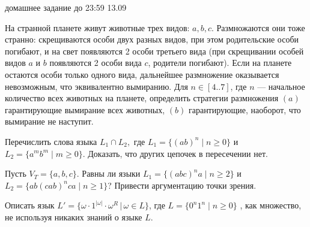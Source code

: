 \documentclass[12pt]{article}
\begin{document}

{\Large домашнее задание до 23:59 13.09}
\bigskip

\enumerate
{
  \item 
  {   
     На странной планете живут животные трех видов: $a, b, c$. Размножаются они тоже странно: скрещиваются особи двух разных видов, при этом родительские особи погибают, и на свет появляются 2 особи третьего вида (при скрещивании особей видов $a$ и $b$ появляются 2 особи вида $c$, родители погибают). Если на планете остаются особи только одного вида, дальнейшее размножение оказывается невозможным, что эквивалентно вымиранию. Для $n \in [4..7]$, где $n$ --- начальное количество всех животных на планете, определить стратегии размножения $(a)$ гарантирующие вымирание всех животных, $(b)$ гарантирующие, наоборот, что вымирание не наступит.
  }
  \item
  {
    Перечислить слова языка $L_1 \cap L_2,$ где $L_1 = \{ (ab)^n \mid n \geq 0 \}$ и $L_2 = \{ a^m b^m \mid m \geq 0 \}$. Доказать, что других цепочек в пересечении нет. 
  }
  \item
  {
    Пусть $V_T = \{a,b,c\}$. Равны ли языки $L_1 = \{ (abc)^n a \mid n \geq 2 \}$ и $L_2 = \{ ab (cab)^n ca \mid n \geq 1 \}$? Привести аргументацию точки зрения. 
  }
  \item
  {
    Описать язык $L' = \{ \omega \cdot 1^{|\omega|} \cdot \omega^R \, | \, \omega \in L \}$, где $L = \{ 0^n 1^n \mid n \geq 0 \}$ , как множество, не используя никаких знаний о языке $L$.
  }
}
\end{document}
